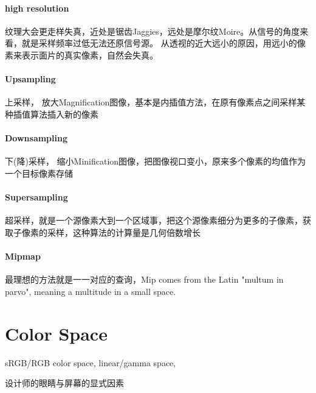 \paragraph{high resolution}
纹理大会更走样失真，近处是锯齿Jaggies，远处是摩尔纹Moire。从信号的角度来看，就是采样频率过低无法还原信号源。
从透视的近大远小的原因，用远小的像素来表示面片的真实像素，自然会失真。

\paragraph{Upsampling}
上采样，
放大Magnification图像，基本是内插值方法，在原有像素点之间采样某种插值算法插入新的像素

\paragraph{Downsampling}
下(降)采样，
缩小Minification图像，把图像视口变小，原来多个像素的均值作为一个目标像素存储

\paragraph{Supersampling}
超采样，就是一个源像素大到一个区域事，把这个源像素细分为更多的子像素，获取子像素的采样，这种算法的计算量是几何倍数增长

\paragraph{Mipmap}
最理想的方法就是一一对应的查询，Mip comes from the Latin "multum in parvo", meaning a multitude in a small space.


\section{Color Space}
sRGB/RGB color space, linear/gamma space, 

设计师的眼睛与屏幕的显式因素

